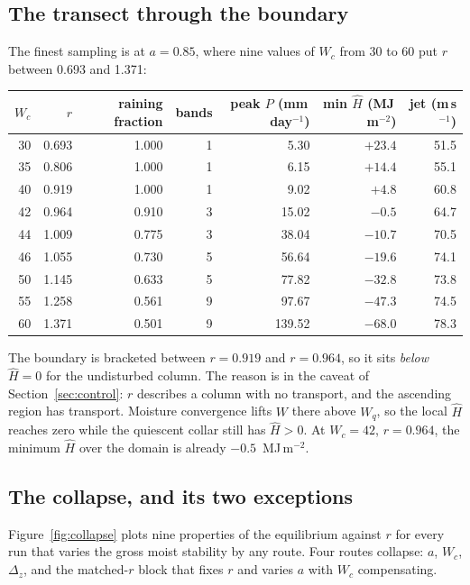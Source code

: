 \documentclass[11pt]{article}
\newcommand{\Hhat}{\hat{H}}
\newcommand{\Wq}{W_q}
\newcommand{\mmday}{mm\,day$^{-1}$}
\newcommand{\ms}{m\,s$^{-1}$}
\begin{document}
\subsection{The transect through the boundary}

The finest sampling is at $a = 0.85$, where nine values of $W_c$ from 30 to 60
put $r$ between 0.693 and 1.371:

\begin{center}
\begin{tabular}{rrrrrrr}
\toprule
$W_c$ & $r$ & raining fraction & bands & peak $P$ (\mmday) & min $\Hhat$ (MJ\,m$^{-2}$) & jet (\ms)\\
\midrule
30 & 0.693 & 1.000 & 1 & 5.30  & $+23.4$ & 51.5\\
35 & 0.806 & 1.000 & 1 & 6.15  & $+14.4$ & 55.1\\
40 & 0.919 & 1.000 & 1 & 9.02  & $+4.8$  & 60.8\\
42 & 0.964 & 0.910 & 3 & 15.02 & $-0.5$  & 64.7\\
44 & 1.009 & 0.775 & 3 & 38.04 & $-10.7$ & 70.5\\
46 & 1.055 & 0.730 & 5 & 56.64 & $-19.6$ & 74.1\\
50 & 1.145 & 0.633 & 5 & 77.82 & $-32.8$ & 73.8\\
55 & 1.258 & 0.561 & 9 & 97.67 & $-47.3$ & 74.5\\
60 & 1.371 & 0.501 & 9 & 139.52& $-68.0$ & 78.3\\
\bottomrule
\end{tabular}
\end{center}

The boundary is bracketed between $r = 0.919$ and $r = 0.964$, so it sits
\emph{below} $\Hhat = 0$ for the undisturbed column. The reason is in the
caveat of Section~\ref{sec:control}: $r$ describes a column with no transport,
and the ascending region has transport. Moisture convergence lifts $W$ there
above $\Wq$, so the local $\Hhat$ reaches zero while the quiescent collar still
has $\Hhat > 0$. At $W_c = 42$, $r = 0.964$, the minimum $\Hhat$ over the domain
is already $-0.5$~MJ\,m$^{-2}$.

\subsection{The collapse, and its two exceptions}

Figure~\ref{fig:collapse} plots nine properties of the equilibrium against $r$
for every run that varies the gross moist stability by any route. Four routes
collapse: $a$, $W_c$, $\Delta_z$, and the matched-$r$ block that fixes $r$ and
varies $a$ with $W_c$ compensating.
\end{document}
